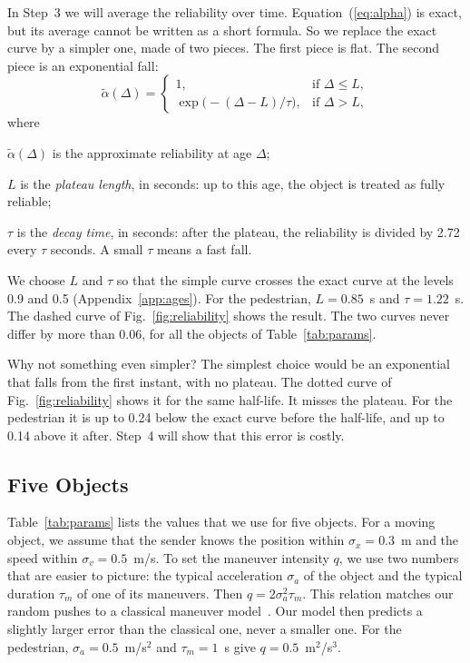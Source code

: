 \documentclass[conference]{IEEEtran}
\newcommand{\as}{\tilde{\alpha}}             %
\newcommand{\Eq}[1]{Equation~(\ref{#1})}     %
\newenvironment{where}{\begin{list}{\textbullet}{\setlength{\topsep}{2pt}\setlength{\partopsep}{0pt}%
\setlength{\itemsep}{0pt}\setlength{\parsep}{0pt}\setlength{\leftmargin}{1.5em}%
\setlength{\labelwidth}{0.6em}\setlength{\labelsep}{0.5em}}}{\end{list}}
\begin{document}
In Step~3 we will average the reliability over time. \Eq{eq:alpha} is exact,
but its average cannot be written as a short formula. So we replace the exact
curve by a simpler one, made of two pieces. The first piece is flat. The
second piece is an exponential fall:
\begin{equation}\label{eq:plateau}
\as(\Delta)=
\begin{cases}
1, & \text{if } \Delta\le L,\\[2pt]
\exp\!\big(-(\Delta-L)/\tau\big), & \text{if } \Delta> L,
\end{cases}
\end{equation}
where
\begin{where}
\item $\as(\Delta)$ is the approximate reliability at age $\Delta$;
\item $L$ is the \emph{plateau length}, in seconds: up to this age, the object
is treated as fully reliable;
\item $\tau$ is the \emph{decay time}, in seconds: after the plateau, the
reliability is divided by 2.72 every $\tau$ seconds. A small $\tau$ means a
fast fall.
\end{where}

We choose $L$ and $\tau$ so that the simple curve crosses the exact curve at
the levels 0.9 and 0.5 (Appendix~\ref{app:ages}). For the pedestrian,
$L=0.85$~s and $\tau=1.22$~s. The dashed curve of Fig.~\ref{fig:reliability}
shows the result. The two curves never differ by more than 0.06, for all the
objects of Table~\ref{tab:params}.

Why not something even simpler? The simplest choice would be an exponential
that falls from the first instant, with no plateau. The dotted curve of
Fig.~\ref{fig:reliability} shows it for the same half-life. It misses the
plateau. For the pedestrian it is up to 0.24 below the exact curve before the
half-life, and up to 0.14 above it after. Step~4 will show that this error is
costly.

\subsection{Five Objects}\label{sec:objects}

Table~\ref{tab:params} lists the values that we use for five objects. For a
moving object, we assume that the sender knows the position within
$\sigma_x=0.3$~m and the speed within $\sigma_v=0.5$~m/s. To set the maneuver
intensity $q$, we use two numbers that are easier to picture: the typical
acceleration $\sigma_a$ of the object and the typical duration $\tau_m$ of one
of its maneuvers. Then $q=2\sigma_a^2\tau_m$. This relation matches our random
pushes to a classical maneuver model~\cite{singer1970}. Our model then
predicts a slightly larger error than the classical one, never a smaller one.
For the pedestrian, $\sigma_a=0.5$~m/s$^2$ and
$\tau_m=1$~s give $q=0.5$~m$^2$/s$^3$.
\end{document}
